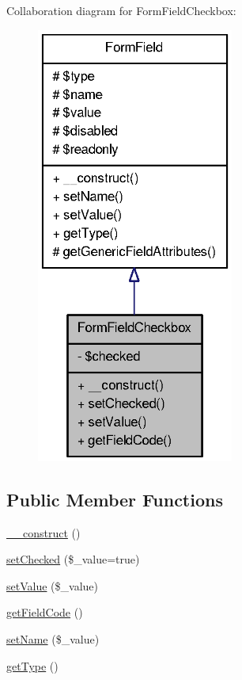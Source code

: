 Collaboration diagram for FormFieldCheckbox:\nopagebreak
\begin{figure}[H]
\begin{center}
\leavevmode
\includegraphics[width=184pt]{classFormFieldCheckbox__coll__graph}
\end{center}
\end{figure}
\subsection*{Public Member Functions}
\begin{DoxyCompactItemize}
\item 
\hyperlink{classFormFieldCheckbox_a9ea37cd03013e361f11680049c1a0097}{\_\-\_\-construct} ()
\item 
\hyperlink{classFormFieldCheckbox_a944623b7e1136bab6dd9880980037425}{setChecked} (\$\_\-value=true)
\item 
\hyperlink{classFormFieldCheckbox_a787abee157599c389a18e0810f69fed5}{setValue} (\$\_\-value)
\item 
\hyperlink{classFormFieldCheckbox_aaa7647c07d938553d8bec7afa869ebc0}{getFieldCode} ()
\item 
\hyperlink{classFormField_ad57e32bd53170af060e869b3b60f0ef7}{setName} (\$\_\-value)
\item 
\hyperlink{classFormField_a1f64b737bccb6b2827f8c5665b9920c7}{getType} ()
\end{DoxyCompactItemize}
